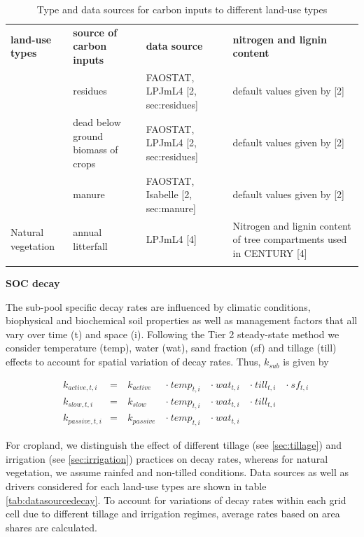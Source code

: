 \documentclass[gc, manuscript]{copernicus}
\begin{document}
 \begin{table}[h]
 \caption{Type and data sources for carbon inputs to different land-use types }
 \begin{tabular}{l l l l}
 \tophline
  \textbf{land-use types}   & \textbf{source of carbon inputs} & \textbf{data source} & \textbf{nitrogen and lignin content} \\
 \middlehline
 \multirow{3}{*}{Cropland} & residues & FAOSTAT, LPJmL4 [2, sec:residues] & default values given by [2]  \\
                            & dead below ground biomass of crops & FAOSTAT, LPJmL4 [2, sec:residues] & default values given by [2] \\
                            & manure & FAOSTAT, Isabelle [2, sec:manure] & default values given by [2] \\
                            \hline
  Natural vegetation        & annual litterfall & LPJmL4 [4]& \begin{minipage}[t]{0.28\columnwidth}\raggedright\strut Nitrogen and lignin content of tree compartments used in CENTURY [4] \strut \end{minipage}\tabularnewline
 \bottomhline
 \end{tabular}
 \label{tab:datasourceinputs}
 \belowtable{}
 \end{table}

\textbf{SOC decay}

The sub-pool specific decay rates are influenced by climatic conditions, biophysical and biochemical soil properties as well as management factors that all vary over time (t) and space (i). Following the Tier 2 steady-state method we consider temperature (temp), water (wat), sand fraction (sf) and tillage (till) effects to account for spatial variation of decay rates. Thus, \(k_{sub}\) is given by

\begin{equation}
\begin{aligned}
& k_{active,t,i}  & = &~ k_{active}  ~ &\cdot~ temp_{t,i} ~ &\cdot~ wat_{t,i} ~ &\cdot~ till_{t,i} ~ & \cdot~ sf_{t,i}\\
& k_{slow,t,i}    & = &~ k_{slow}    ~ &\cdot~ temp_{t,i} ~ &\cdot~ wat_{t,i} ~ &\cdot~ till_{t,i} ~ &\\
& k_{passive,t,i} & = &~ k_{passive} ~ &\cdot~ temp_{t,i} ~ &\cdot~ wat_{t,i} ~ & ~ &
\label{eq:decayrates}
\end{aligned}
\end{equation}

For cropland, we distinguish the effect of different tillage (see \ref{sec:tillage}) and irrigation (see \ref{sec:irrigation}) practices on decay rates, whereas for natural vegetation, we assume rainfed and non-tilled conditions. Data sources as well as drivers considered for each land-use types are shown in table \ref{tab:datasourcedecay}. To account for variations of decay rates within each grid cell due to different tillage and irrigation regimes, average rates based on area shares are calculated.
\end{document}
